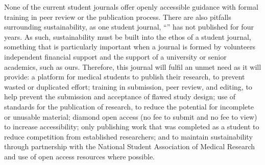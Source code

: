 None of the current student journals offer openly accessible guidance with formal training in peer review or the publication process. There are also pitfalls surrounding sustainability, as one student journal, ``\citeauthor{ScottishUniversitiesMedicalJournal2014}'' has not published for four years. As such, sustainability must be built into the ethos of a student journal, something that is particularly important when a journal is formed by volunteers independent financial support and the support of a university or senior academics, such as ours.
Therefore, this journal will fulfil an unmet need as it will provide: a platform for medical students to publish their research, to prevent wasted or duplicated effort; training in submission, peer review, and editing, to help prevent the submission and acceptance of flawed study design; use of standards for the publication of research, to reduce the potential for incomplete or unusable material; diamond open access (no fee to submit and no fee to view) to increase accessibility; only publishing work that was completed as a student to reduce competition from established researchers; and to maintain sustainability through partnership with the National Student Association of Medical Research and use of open access resources where possible.